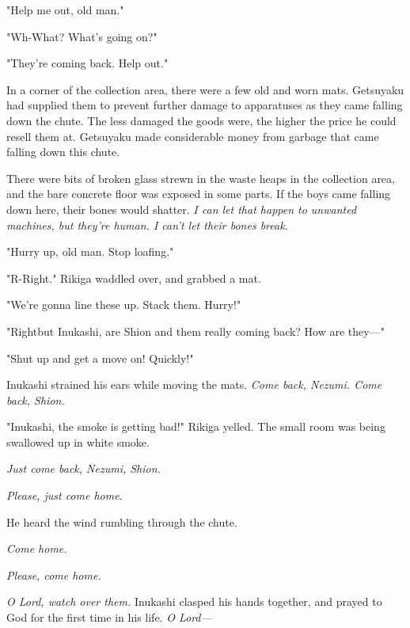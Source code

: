 "Help me out, old man."

"Wh-What? What's going on?"

"They're coming back. Help out."

In a corner of the collection area, there were a few old and worn mats.
Getsuyaku had supplied them to prevent further damage to apparatuses as
they came falling down the chute. The less damaged the goods were, the
higher the price he could resell them at. Getsuyaku made considerable
money from garbage that came falling down this chute.

There were bits of broken glass strewn in the waste heaps in the
collection area, and the bare concrete floor was exposed in some parts.
If the boys came falling down here, their bones would shatter. \emph{I can let
that happen to unwanted machines, but they're human. I can't let their
bones break.}

"Hurry up, old man. Stop loafing."

"R-Right." Rikiga waddled over, and grabbed a mat.

"We're gonna line these up. Stack them. Hurry!"

"Right\el but Inukashi, are Shion and them really coming back? How are
they---"

"Shut up and get a move on! Quickly!"

Inukashi strained his ears while moving the mats. \emph{Come back, Nezumi.
Come back, Shion.}

"Inukashi, the smoke is getting bad!" Rikiga yelled. The small room was
being swallowed up in white smoke.

\emph{Just come back, Nezumi, Shion.}

\emph{Please, just come home.}

He heard the wind rumbling through the chute.

\emph{Come home.}

\emph{Please, come home.}

\emph{O Lord, watch over them.} Inukashi clasped his hands together, and prayed
to God for the first time in his life. \emph{O Lord---}